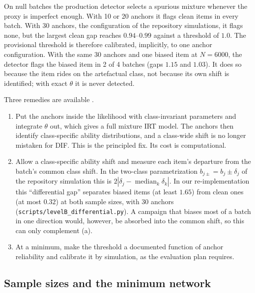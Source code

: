 \begin{finding}\label{find:proxy}\empirical{}
On null batches the production detector selects a spurious mixture whenever the proxy is
imperfect enough. With 10 or 20 anchors it flags clean items in every batch. With 30 anchors,
the configuration of the repository simulations, it flags none, but the largest clean gap
reaches $0.94$--$0.99$ against a threshold of $1.0$. The provisional threshold is therefore
calibrated, implicitly, to one anchor configuration. With the same 30 anchors and one biased
item at $N=6000$, the detector flags the biased item in 2 of 4 batches (gaps $1.15$ and $1.03$).
It does so because the item rides on the artefactual class, not because its own shift is
identified; with exact $\theta$ it is never detected.
\end{finding}

Three remedies are available \openq.
\begin{enumerate}[label=(\alph*)]
  \item Put the anchors inside the likelihood with class-invariant parameters and integrate
    $\theta$ out, which gives a full mixture IRT model. The anchors then identify class-specific
    ability distributions, and a class-wide shift is no longer mistaken for DIF. This is the
    principled fix. Its cost is computational.
  \item Allow a class-specific ability shift and measure each item's departure from the batch's
    common class shift. In the two-class parametrization $b_{j\pm}=b_j\pm\delta_j$ of the
    repository simulation this is $2|\delta_j-\operatorname{median}_k\delta_k|$. In our re-implementation
    this ``differential gap'' separates biased items (at least $1.65$) from clean ones (at most
    $0.32$) at both sample sizes, with 30 anchors
    (\texttt{scripts/levelB\_differential.py}). A campaign that biases most of a batch in
    one direction would, however, be absorbed into the common shift, so this can only
    complement (a).
  \item At a minimum, make the threshold a documented function of anchor reliability and
    calibrate it by simulation, as the evaluation plan requires.
\end{enumerate}

\subsection{Sample sizes and the minimum network}


